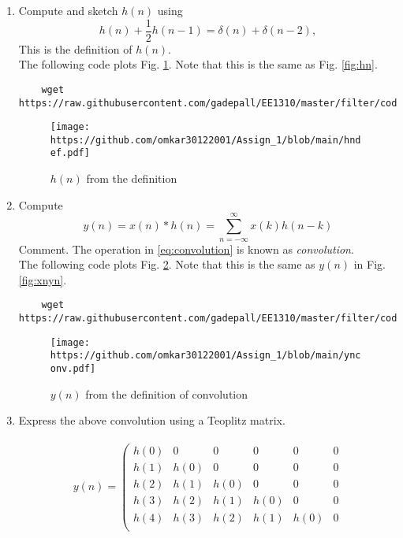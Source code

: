 \documentclass[journal,12pt,twocolumn]{IEEEtran}
\renewcommand\thesection{\arabic{section}}
\begin{document}
\begin{enumerate}[label=\thesection.\arabic*]
\item 
Compute and sketch $h(n)$ using 
\begin{equation}
	\label{eq:iir_filter_h}
	h(n) + \frac{1}{2}h(n-1) = \delta(n) + \delta(n-2), 
\end{equation}
%
This is the definition of $h(n)$.
\\
\solution The following code plots Fig. \ref{fig:hndef}. Note that this is the same as Fig. 
\ref{fig:hn}. 
%
\begin{lstlisting}
	wget https://raw.githubusercontent.com/gadepall/EE1310/master/filter/codes/hndef.py
\end{lstlisting}
\begin{figure}[!ht]
	\centering
	\texttt{[image: https://github.com/omkar30122001/Assign\_1/blob/main/hndef.pdf]}
	\caption{$h(n)$ from the definition}
	\label{fig:hndef}
\end{figure}
%
\item Compute 
%
\begin{equation}
	\label{eq:convolution}
	y(n) = x(n)*h(n) = \sum_{n=-\infty}^{\infty}x(k)h(n-k)
\end{equation}
%
Comment. The operation in \eqref{eq:convolution} is known as
{\em convolution}.
%
\\
\solution The following code plots Fig. \ref{fig:ynconv}. Note that this is the same as 
$y(n)$ in  Fig. 
\ref{fig:xnyn}. 
%
\begin{lstlisting}
	wget https://raw.githubusercontent.com/gadepall/EE1310/master/filter/codes/ynconv.py
\end{lstlisting}
\begin{figure}[!ht]
	\centering
	\texttt{[image: https://github.com/omkar30122001/Assign\_1/blob/main/ynconv.pdf]}
	\caption{$y(n)$ from the definition of convolution}
	\label{fig:ynconv}
\end{figure}
\item Express the above convolution using a Teoplitz matrix. \\
\solution \\
\begin{equation}
	y(n) = 
	\left(
	\begin{smallmatrix}
		h(0) & 0 & 0 & 0 & 0 & 0 \\
		h(1) & h(0) & 0 & 0 & 0 & 0 \\
		h(2) & h(1) & h(0) & 0 & 0 & 0 \\
		h(3) & h(2) & h(1) & h(0) & 0 & 0 \\
		h(4) & h(3) & h(2) & h(1) & h(0) & 0 \\

\end{smallmatrix}
\end{equation}
\end{enumerate}
\end{document}
